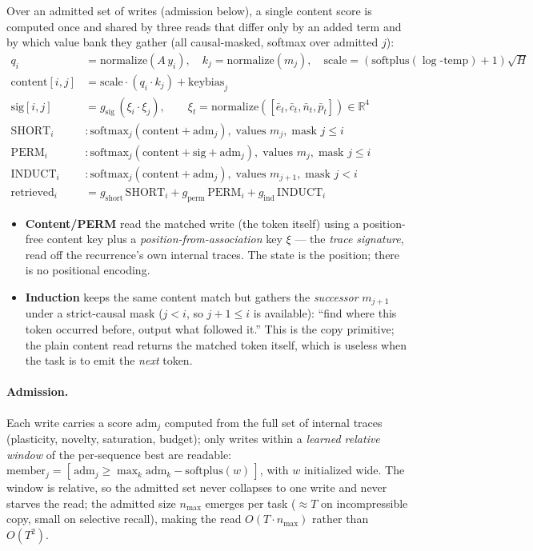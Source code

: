 \documentclass[11pt]{article}
\begin{document}
Over an admitted set of writes (admission below), a single content score is
computed once and shared by three reads that differ only by an added term and
by which value bank they gather (all causal-masked, softmax over admitted
$j$):
\begin{align}
q_i &= \mathrm{normalize}(A\,y_i), \quad k_j = \mathrm{normalize}(m_j), \quad
\mathrm{scale} = (\mathrm{softplus}(\log\text{-temp}) + 1)\sqrt{H} \nonumber\\
\mathrm{content}[i,j] &= \mathrm{scale}\cdot (q_i \cdot k_j) + \mathrm{keybias}_j \nonumber\\
\mathrm{sig}[i,j] &= g_{\mathrm{sig}}\, (\xi_i \cdot \xi_j), \qquad
\xi_t = \mathrm{normalize}([\bar e_t, \bar c_t, \bar n_t, \bar p_t]) \in \mathbb{R}^4 \nonumber\\[2pt]
\mathrm{SHORT}_i &: \mathrm{softmax}_j(\mathrm{content} + \mathrm{adm}_j),
  \;\text{values } m_j, \;\text{mask } j \le i \nonumber\\
\mathrm{PERM}_i &: \mathrm{softmax}_j(\mathrm{content} + \mathrm{sig} + \mathrm{adm}_j),
  \;\text{values } m_j, \;\text{mask } j \le i \nonumber\\
\mathrm{INDUCT}_i &: \mathrm{softmax}_j(\mathrm{content} + \mathrm{adm}_j),
  \;\text{values } m_{j+1}, \;\text{mask } j < i \nonumber\\[2pt]
\mathrm{retrieved}_i &= g_{\mathrm{short}}\,\mathrm{SHORT}_i + g_{\mathrm{perm}}\,\mathrm{PERM}_i + g_{\mathrm{ind}}\,\mathrm{INDUCT}_i
\end{align}

\begin{itemize}
\item \textbf{Content/PERM} read the matched write (the token itself) using a
position-free content key plus a \emph{position-from-association} key $\xi$
--- the \emph{trace signature}, read off the recurrence's own internal traces.
The state is the position; there is no positional encoding.
\item \textbf{Induction} keeps the same content match but gathers the
\emph{successor} $m_{j+1}$ under a strict-causal mask ($j < i$, so $j{+}1 \le
i$ is available): ``find where this token occurred before, output what
followed it.'' This is the copy primitive; the plain content read returns the
matched token itself, which is useless when the task is to emit the
\emph{next} token.
\end{itemize}

\paragraph{Admission.} Each write carries a score $\mathrm{adm}_j$ computed
from the full set of internal traces (plasticity, novelty, saturation,
budget); only writes within a \emph{learned relative window} of the
per-sequence best are readable:
$\mathrm{member}_j = [\,\mathrm{adm}_j \ge \max_k \mathrm{adm}_k -
\mathrm{softplus}(w)\,]$, with $w$ initialized wide. The window is relative,
so the admitted set never collapses to one write and never starves the read;
the admitted size $n_{\max}$ emerges per task ($\approx T$ on incompressible
copy, small on selective recall), making the read $O(T \cdot n_{\max})$
rather than $O(T^2)$.
\end{document}
